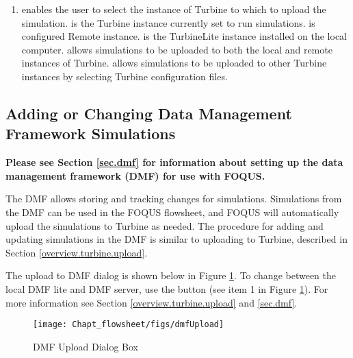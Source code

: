 \begin{enumerate}
	\item {} enables the user to select the instance of Turbine to which to upload the simulation.  is the Turbine instance currently set to run simulations.  is configured Remote instance.  is the TurbineLite instance installed on the local computer.  allows simulations to be uploaded to both the local and remote instances of Turbine.   allows simulations to be uploaded to other Turbine instances by selecting Turbine configuration files.
\end{enumerate}

\subsection{Adding or Changing Data Management Framework  Simulations}\label{overview.dmf.upload}

\textbf{Please see Section \ref{sec.dmf} for information about setting up the data management framework (DMF) for use with FOQUS.}

The DMF allows storing and tracking changes for simulations.  Simulations from the DMF can be used in the FOQUS flowsheet, and FOQUS will automatically upload the simulations to Turbine as needed. The procedure for adding and updating simulations in the DMF is similar to uploading to Turbine, described in Section \ref{overview.turbine.upload}.  

The upload to DMF dialog is shown below in Figure \ref{fig.dmf.upload}. To change between the local DMF lite and DMF server, use the  button (see item 1 in Figure \ref{fig.dmf.upload}). For more information see Section \ref{overview.turbine.upload} and \ref{sec.dmf}.

\begin{figure}[H]
	\begin{center}
		\texttt{[image: Chapt\_flowsheet/figs/dmfUpload]}
		\caption{DMF Upload Dialog Box}
		\label{fig.dmf.upload}
	\end{center}
\end{figure}



